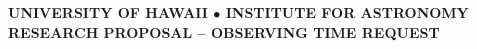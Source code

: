 \documentclass[letterpaper,11pt]{article}
\begin{document}
\pagestyle{plain}

\begin{center} 
\bfseries\uppercase{\Large{University of Hawaii $\bullet$ Institute for Astronomy} \\ 
\large{Research Proposal -- Observing Time Request}}
\end{center}
\vspace{-0.3cm}

\end{document}
